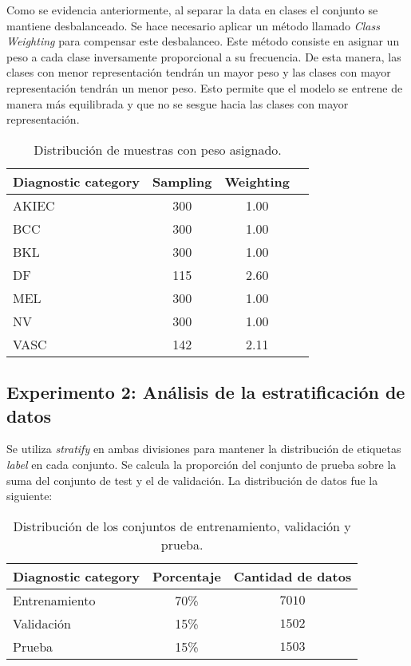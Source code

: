 Como se evidencia anteriormente, al separar la data en clases el conjunto se mantiene desbalanceado. Se hace necesario aplicar un método llamado \textit{Class Weighting} para compensar este desbalanceo. Este método consiste en asignar un peso a cada clase inversamente proporcional a su frecuencia. De esta manera, las clases con menor representación tendrán un mayor peso y las clases con mayor representación tendrán un menor peso. Esto permite que el modelo se entrene de manera más equilibrada y que no se sesgue hacia las clases con mayor representación.

\begin{table}[ht]
   \centering
   \begin{tabular}{lccc}
   \hline
   Diagnostic category & Sampling  & Weighting\\ \hline
   AKIEC & 300 & 1.00\\
   BCC & 300 & 1.00\\
   BKL & 300 & 1.00\\
   DF & 115 & 2.60\\
   MEL & 300 & 1.00\\
   NV & 300 & 1.00\\
   VASC & 142 & 2.11\\ \hline
   \end{tabular}
   \caption{Distribución de muestras con peso asignado.}
   \label{tab:weighting_distribution}
   \end{table}


\subsection{Experimento 2: Análisis de la estratificación de datos}

Se utiliza \textit{stratify} en ambas divisiones para mantener la distribución de etiquetas \textit{label} en cada conjunto. Se calcula la proporción del conjunto de prueba sobre la suma del conjunto de test y el de validación. La distribución de datos fue la siguiente:

   \begin{table}[ht]
      \centering
      \begin{tabular}{lcc}
      \hline
      \textbf{Diagnostic category} & \textbf{Porcentaje} & \textbf{Cantidad de datos} \\
      \hline
      Entrenamiento       & 70\% &  $7010$ \\
      Validación      & 15\% & $1502$  \\
      Prueba      & 15\% & $1503$  \\ \hline
      \end{tabular}
      \caption{Distribución de los conjuntos de entrenamiento, validación y prueba.}
      \label{table:data_distribution_e2}
      \end{table}

